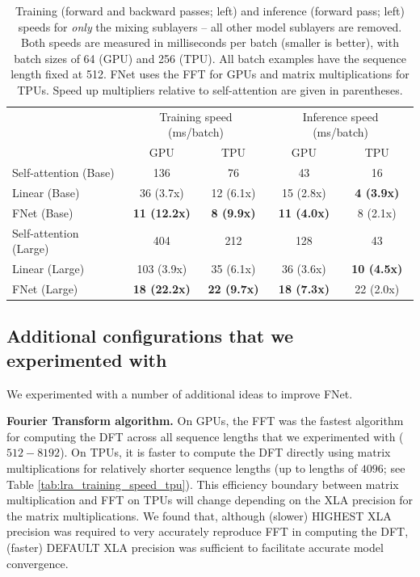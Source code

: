\begin{table}
    \caption{Training (forward and backward passes; left) and inference (forward pass; left) speeds for \emph{only} the mixing sublayers -- all other model sublayers are removed. Both speeds are measured in milliseconds per batch (smaller is better), with batch sizes of 64 (GPU) and 256 (TPU). All batch examples have the sequence length fixed at 512. FNet uses the FFT for GPUs and matrix multiplications for TPUs. Speed up multipliers relative to self-attention are given in parentheses.}
    \label{tab:mixing_speeds}
    \centering
    \begin{tabular}{l | c c | c c}
        \hline
         & \multicolumn{2}{c|}{Training speed (ms/batch)} & \multicolumn{2}{c}{Inference speed (ms/batch)} \\ 
         & GPU & TPU & GPU & TPU\\ \hline \hline
         Self-attention (Base) & 136 & 76 & 43 & 16 \\
         Linear (Base) & 36 (3.7x) & 12 (6.1x) & 15 (2.8x) & \textbf{4 (3.9x)} \\
         FNet (Base) & \textbf{11 (12.2x)} & \textbf{8 (9.9x)} & \textbf{11 (4.0x)} & 8 (2.1x) \\ \hline
         Self-attention (Large) & 404 & 212 & 128 & 43 \\
         Linear (Large) & 103 (3.9x) & 35 (6.1x) & 36 (3.6x) & \textbf{10 (4.5x)} \\
         FNet (Large) & \textbf{18 (22.2x)} & \textbf{22 (9.7x)} & \textbf{18 (7.3x)} & 22 (2.0x)\\ \hline
    \end{tabular}
\end{table}


\subsection{Additional configurations that we experimented with}
\label{app:things_we_tried}

We experimented with a number of additional ideas to improve FNet.

\textbf{Fourier Transform algorithm.} On GPUs, the FFT was the fastest algorithm for computing the DFT across all sequence lengths that we experimented with ($512-8192$). On TPUs, it is faster to compute the DFT directly using matrix multiplications for relatively shorter sequence lengths (up to lengths of $4096$; see Table \ref{tab:lra_training_speed_tpu}). This efficiency boundary between matrix multiplication and FFT on TPUs will change depending on the XLA precision for the matrix multiplications. We found that, although (slower) HIGHEST XLA precision was required to very accurately reproduce FFT in computing the DFT, (faster) DEFAULT XLA precision was sufficient to facilitate accurate model convergence.

